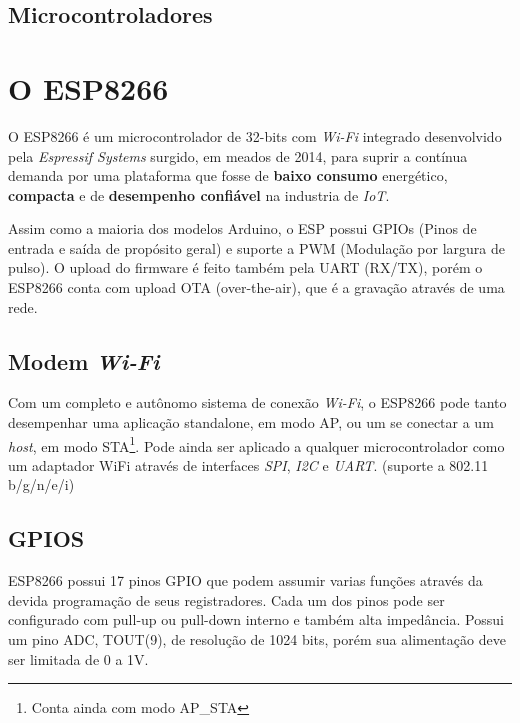 \documentclass[
	10pt,				%
	openright,			%
	twoside,			%
	a5paper,			%
	english,			%
	french,				%
	spanish,			%
	brazil,				%
	sumario=tradicional
]{abntex2}
\begin{document}
\section{Microcontroladores}


 
\chapter{O ESP8266}

\lettrine[nindent=0.35em,lhang=0.40,loversize=0.3]{O}{ ESP8266} é um microcontrolador de 32-bits com \textit{Wi-Fi} integrado desenvolvido pela \textit{Espressif Systems} surgido, em meados de 2014, para suprir a contínua demanda por uma plataforma que fosse de \textsf{\textbf{baixo consumo}} energético, \textsf{\textbf{compacta}} e de \textsf{\textbf{desempenho confiável}} na industria de \textit{IoT}.

Assim como a maioria dos modelos Arduino, o ESP possui GPIOs (Pinos de entrada e saída de propósito geral) e suporte a PWM (Modulação por largura de pulso). O upload do firmware é feito também pela UART (RX/TX), porém o ESP8266 conta com upload OTA (over-the-air), que é a gravação através de uma rede.  

\section{Modem \textit{Wi-Fi}}
Com um completo e autônomo sistema de conexão \textit{Wi-Fi}, o ESP8266 pode tanto desempenhar uma aplicação standalone, em modo AP, ou um se conectar a um \textit{host}, em modo STA\footnote{Conta ainda com modo AP\_STA}. Pode ainda ser aplicado a qualquer microcontrolador como um adaptador WiFi através de interfaces \textit{SPI}, \textit{I2C} e \textit{UART}. 
(suporte a 802.11 b/g/n/e/i)
\section{GPIOS}

ESP8266 possui 17 pinos GPIO que podem assumir varias funções através da devida programação de seus registradores. Cada um dos pinos pode ser configurado com pull-up ou pull-down interno e também alta impedância. Possui um pino ADC, TOUT(9), de resolução de 1024 bits, porém sua alimentação deve ser limitada de 0 a 1V.
\end{document}

